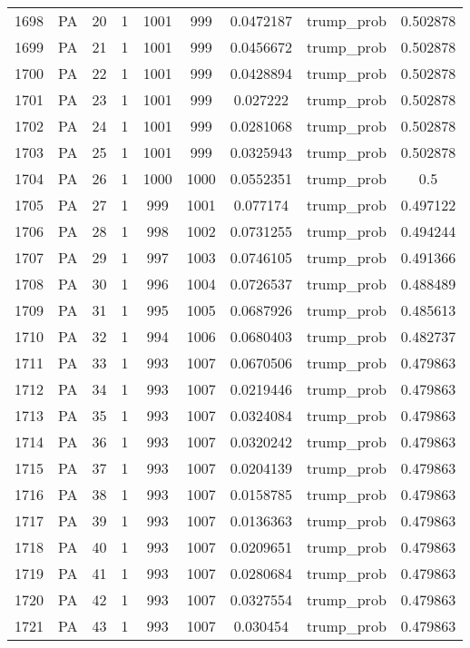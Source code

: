 \documentclass[12pt,a4paper]{article}
\begin{document}
\begin{tabular}{r|cccccccc}
	1698 & PA & 20 & 1 & 1001 & 999 & 0.0472187 & trump\_prob & 0.502878 \\
	1699 & PA & 21 & 1 & 1001 & 999 & 0.0456672 & trump\_prob & 0.502878 \\
	1700 & PA & 22 & 1 & 1001 & 999 & 0.0428894 & trump\_prob & 0.502878 \\
	1701 & PA & 23 & 1 & 1001 & 999 & 0.027222 & trump\_prob & 0.502878 \\
	1702 & PA & 24 & 1 & 1001 & 999 & 0.0281068 & trump\_prob & 0.502878 \\
	1703 & PA & 25 & 1 & 1001 & 999 & 0.0325943 & trump\_prob & 0.502878 \\
	1704 & PA & 26 & 1 & 1000 & 1000 & 0.0552351 & trump\_prob & 0.5 \\
	1705 & PA & 27 & 1 & 999 & 1001 & 0.077174 & trump\_prob & 0.497122 \\
	1706 & PA & 28 & 1 & 998 & 1002 & 0.0731255 & trump\_prob & 0.494244 \\
	1707 & PA & 29 & 1 & 997 & 1003 & 0.0746105 & trump\_prob & 0.491366 \\
	1708 & PA & 30 & 1 & 996 & 1004 & 0.0726537 & trump\_prob & 0.488489 \\
	1709 & PA & 31 & 1 & 995 & 1005 & 0.0687926 & trump\_prob & 0.485613 \\
	1710 & PA & 32 & 1 & 994 & 1006 & 0.0680403 & trump\_prob & 0.482737 \\
	1711 & PA & 33 & 1 & 993 & 1007 & 0.0670506 & trump\_prob & 0.479863 \\
	1712 & PA & 34 & 1 & 993 & 1007 & 0.0219446 & trump\_prob & 0.479863 \\
	1713 & PA & 35 & 1 & 993 & 1007 & 0.0324084 & trump\_prob & 0.479863 \\
	1714 & PA & 36 & 1 & 993 & 1007 & 0.0320242 & trump\_prob & 0.479863 \\
	1715 & PA & 37 & 1 & 993 & 1007 & 0.0204139 & trump\_prob & 0.479863 \\
	1716 & PA & 38 & 1 & 993 & 1007 & 0.0158785 & trump\_prob & 0.479863 \\
	1717 & PA & 39 & 1 & 993 & 1007 & 0.0136363 & trump\_prob & 0.479863 \\
	1718 & PA & 40 & 1 & 993 & 1007 & 0.0209651 & trump\_prob & 0.479863 \\
	1719 & PA & 41 & 1 & 993 & 1007 & 0.0280684 & trump\_prob & 0.479863 \\
	1720 & PA & 42 & 1 & 993 & 1007 & 0.0327554 & trump\_prob & 0.479863 \\
	1721 & PA & 43 & 1 & 993 & 1007 & 0.030454 & trump\_prob & 0.479863 \\

\end{tabular}
\end{document}
